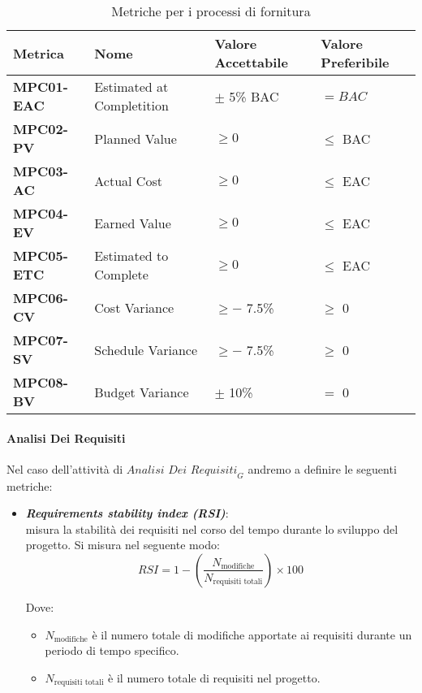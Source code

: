 \begin{table}[htbp]
    \centering
    \begin{tabular}{|>{\centering\arraybackslash}p{3cm}|p{5cm}|p{4cm}|p{4cm}|}
    \hline
    \rowcolor{gray!30}
    \textbf{Metrica} & \textbf{Nome} & \textbf{Valore Accettabile} & \textbf{Valore Preferibile} \\
    \hline
    \rowcolor{gray!10}
    \textbf{MPC01-EAC} & Estimated at Completition & $\pm$ 5\% BAC & $=BAC$ \\
    \hline
    \rowcolor{gray!10}
    \textbf{MPC02-PV} & Planned Value & $\geq 0$ & $\leq$ BAC \\
    \hline
    \rowcolor{gray!10}
    \textbf{MPC03-AC} & Actual Cost & $\geq 0$ & $\leq$ EAC \\
    \hline
    \rowcolor{gray!10}
    \textbf{MPC04-EV} & Earned Value & $\geq 0$ & $\leq$ EAC \\
    \hline
    \rowcolor{gray!10}
    \textbf{MPC05-ETC} & Estimated to Complete & $\geq 0$ & $\leq$ EAC \\
    \hline
    \rowcolor{gray!10}
    \textbf{MPC06-CV} & Cost Variance & $\geq -$ 7.5\% & $\geq$ 0 \\
    \hline
    \rowcolor{gray!10}
    \textbf{MPC07-SV} & Schedule Variance & $\geq -$ 7.5\% & $\geq$ 0 \\
    \hline
    \rowcolor{gray!10}
    \textbf{MPC08-BV} & Budget Variance & $\pm$ 10\% & $=$ 0 \\
    \hline
    \end{tabular}
    \caption{Metriche per i processi di fornitura}
\end{table}


\paragraph{Analisi Dei Requisiti}
Nel caso dell'attività di $\textit{Analisi Dei Requisiti}_G$ andremo a definire le seguenti metriche:
\begin{itemize}
    \item \textbf{\emph{Requirements stability index (RSI)}}:\\
    misura la stabilità dei requisiti nel corso del tempo durante lo sviluppo del progetto. Si misura nel seguente modo:
    \[
    RSI = 1 - \left( \frac{N_{\text{modifiche}}}{N_{\text{requisiti totali}}} \right) \times 100
    \]

    Dove:
    \begin{itemize}
        \item \(N_{\text{modifiche}}\) è il numero totale di modifiche apportate ai requisiti durante un periodo di tempo specifico.
        \item \(N_{\text{requisiti totali}}\) è il numero totale di requisiti nel progetto.
    \end{itemize}
\end{itemize}
